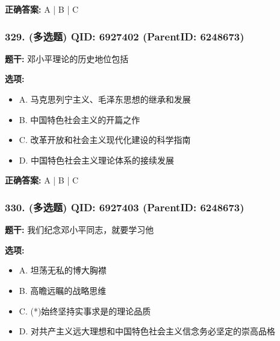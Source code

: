 \documentclass[12pt,UTF8]{ctexart}
\begin{document}
\textbf{正确答案:}
A | B | C

\vspace{0.3em}\hrulefill\vspace{0.7em}

\subsubsection*{329. (多选题) \small QID: 6927402 (ParentID: 6248673)}

\textbf{题干:}
邓小平理论的历史地位包括



\textbf{选项:}
\begin{itemize}[leftmargin=*]

  \item A. 马克思列宁主义、毛泽东思想的继承和发展

  \item B. 中国特色社会主义的开篇之作

  \item C. 改革开放和社会主义现代化建设的科学指南

  \item D. 中国特色社会主义理论体系的接续发展

\end{itemize}

\textbf{正确答案:}
A | B | C

\vspace{0.3em}\hrulefill\vspace{0.7em}

\subsubsection*{330. (多选题) \small QID: 6927403 (ParentID: 6248673)}

\textbf{题干:}
我们纪念邓小平同志，就要学习他



\textbf{选项:}
\begin{itemize}[leftmargin=*]

  \item A. 坦荡无私的博大胸襟

  \item B. 高瞻远瞩的战略思维

  \item C. (*)始终坚持实事求是的理论品质

  \item D. 对共产主义远大理想和中国特色社会主义信念务必坚定的崇高品格

\end{itemize}
\end{document}
